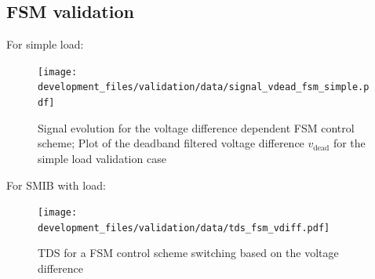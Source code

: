 \subsection{FSM validation}

For simple load:
\begin{figure}[H]
    \centering
    \texttt{[image: development\_files/validation/data/signal\_vdead\_fsm\_simple.pdf]}
    \caption{Signal evolution for the voltage difference dependent \acs{FSM} control scheme; Plot of the deadband filtered voltage difference $v_\mathrm{dead}$ for the simple load validation case}
    \label{fig:signal-vdead-fsm-simple}
\end{figure}

For SMIB with load:

\begin{figure}[H]
    \centering
    \texttt{[image: development\_files/validation/data/tds\_fsm\_vdiff.pdf]}
    \caption[\acs{TDS} for a \acs{FSM} control scheme switching based on the voltage difference]{\acs{TDS} for a \acs{FSM} control scheme switching based on the voltage difference}
    \label{fig:tds-fsm-vdiff-ext-smib}
\end{figure}

